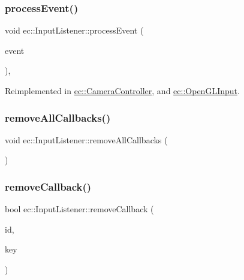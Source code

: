 \mbox{\label{classec_1_1_input_listener_a9ceaefc79c6b0b260e88454616137840}} 
\subsubsection{\texorpdfstring{process\+Event()}{processEvent()}}
{\footnotesize\ttfamily void ec\+::\+Input\+Listener\+::process\+Event (\begin{DoxyParamCaption}\item[{const \mbox{\hyperlink{structec_1_1_input_event}{Input\+Event}} \&}]{event }\end{DoxyParamCaption})\hspace{0.3cm}{\ttfamily [protected]}, {\ttfamily [virtual]}}



Reimplemented in \mbox{\hyperlink{classec_1_1_camera_controller_af44aad5f80005eaadf5d637b3b00c6d6}{ec\+::\+Camera\+Controller}}, and \mbox{\hyperlink{classec_1_1_open_g_l_input_a064a4e318e18d79ad8df19c789f84686}{ec\+::\+Open\+G\+L\+Input}}.

\mbox{\label{classec_1_1_input_listener_ab3c4085477da60677e0a0659f750ead4}} 
\subsubsection{\texorpdfstring{remove\+All\+Callbacks()}{removeAllCallbacks()}}
{\footnotesize\ttfamily void ec\+::\+Input\+Listener\+::remove\+All\+Callbacks (\begin{DoxyParamCaption}{ }\end{DoxyParamCaption})}

\mbox{\label{classec_1_1_input_listener_a1f341d07bdf9c98392cd47c177c73de2}} 
\subsubsection{\texorpdfstring{remove\+Callback()}{removeCallback()}}
{\footnotesize\ttfamily bool ec\+::\+Input\+Listener\+::remove\+Callback (\begin{DoxyParamCaption}\item[{const std\+::string \&}]{id,  }\item[{\mbox{\hyperlink{classec_1_1_input_listener_af5dfb691564fa8e05fcf7f053e3c532b}{Event\+Key\+\_\+\+Type}}}]{key }\end{DoxyParamCaption})}

